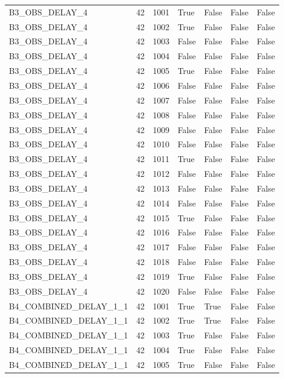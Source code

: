 \documentclass[11pt,a4paper,oneside]{book}
\begin{document}
\begin{longtable}{l l l l l l l}
B3\_OBS\_DELAY\_4 & 42 & 1001 & True & False & False & False \\
B3\_OBS\_DELAY\_4 & 42 & 1002 & True & False & False & False \\
B3\_OBS\_DELAY\_4 & 42 & 1003 & False & False & False & False \\
B3\_OBS\_DELAY\_4 & 42 & 1004 & False & False & False & False \\
B3\_OBS\_DELAY\_4 & 42 & 1005 & True & False & False & False \\
B3\_OBS\_DELAY\_4 & 42 & 1006 & False & False & False & False \\
B3\_OBS\_DELAY\_4 & 42 & 1007 & False & False & False & False \\
B3\_OBS\_DELAY\_4 & 42 & 1008 & False & False & False & False \\
B3\_OBS\_DELAY\_4 & 42 & 1009 & False & False & False & False \\
B3\_OBS\_DELAY\_4 & 42 & 1010 & False & False & False & False \\
B3\_OBS\_DELAY\_4 & 42 & 1011 & True & False & False & False \\
B3\_OBS\_DELAY\_4 & 42 & 1012 & False & False & False & False \\
B3\_OBS\_DELAY\_4 & 42 & 1013 & False & False & False & False \\
B3\_OBS\_DELAY\_4 & 42 & 1014 & False & False & False & False \\
B3\_OBS\_DELAY\_4 & 42 & 1015 & True & False & False & False \\
B3\_OBS\_DELAY\_4 & 42 & 1016 & False & False & False & False \\
B3\_OBS\_DELAY\_4 & 42 & 1017 & False & False & False & False \\
B3\_OBS\_DELAY\_4 & 42 & 1018 & False & False & False & False \\
B3\_OBS\_DELAY\_4 & 42 & 1019 & True & False & False & False \\
B3\_OBS\_DELAY\_4 & 42 & 1020 & False & False & False & False \\
B4\_COMBINED\_DELAY\_1\_1 & 42 & 1001 & True & True & False & False \\
B4\_COMBINED\_DELAY\_1\_1 & 42 & 1002 & True & True & False & False \\
B4\_COMBINED\_DELAY\_1\_1 & 42 & 1003 & True & False & False & False \\
B4\_COMBINED\_DELAY\_1\_1 & 42 & 1004 & True & False & False & False \\
B4\_COMBINED\_DELAY\_1\_1 & 42 & 1005 & True & False & False & False \\

\end{longtable}
\end{document}
